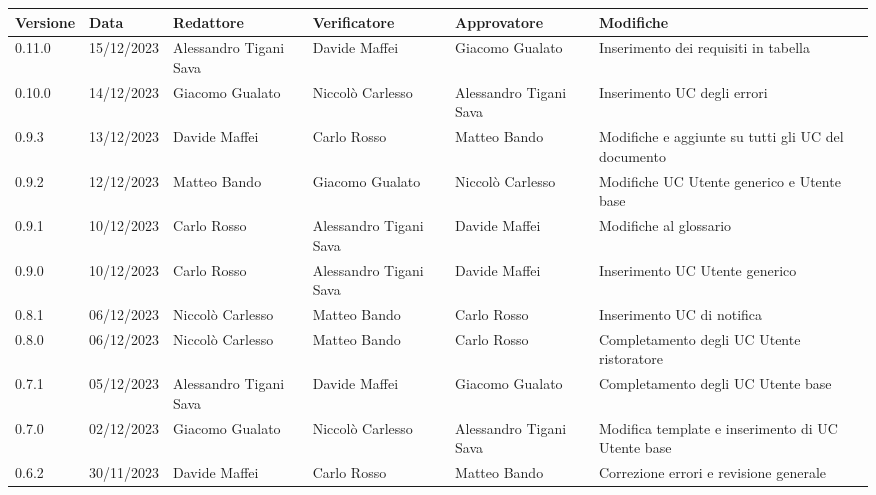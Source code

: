 \begin{table}[H]
	\centering
	\fontsize{10}{12}\selectfont
	\begin{tabularx}{\textwidth}{X|X|X|X|X|X}
		\textbf{Versione}     & \textbf{Data}        & \textbf{Redattore}     &
		\textbf{Verificatore} & \textbf{Approvatore} & \textbf{Modifiche}                                                                                                    \\
		\toprule
		0.11.0                & 15/12/2023           & Alessandro Tigani Sava & Davide Maffei          & Giacomo Gualato        & Inserimento dei requisiti in tabella                                     \\
		\hline
		0.10.0                & 14/12/2023           & Giacomo Gualato        & Niccolò Carlesso       & Alessandro Tigani Sava & Inserimento UC degli errori                                     \\
		0.9.3                 & 13/12/2023           & Davide Maffei          & Carlo Rosso            & Matteo Bando       	& Modifiche e aggiunte su tutti gli UC del documento                                   \\
		\hline
		0.9.2                 & 12/12/2023           & Matteo Bando           & Giacomo Gualato        & Niccolò Carlesso       & Modifiche UC Utente generico e Utente base                                     \\
		\hline
		0.9.1                 & 10/12/2023           & Carlo Rosso            & Alessandro Tigani Sava & Davide Maffei          & Modifiche al glossario                                     \\
		\hline
		0.9.0                 & 10/12/2023           & Carlo Rosso            & Alessandro Tigani Sava & Davide Maffei          & Inserimento UC Utente generico                             \\
		\hline
		0.8.1                 & 06/12/2023           & Niccolò Carlesso       & Matteo Bando           & Carlo Rosso            & Inserimento UC di notifica                                 \\
		\hline
		0.8.0                 & 06/12/2023           & Niccolò Carlesso       & Matteo Bando           & Carlo Rosso            & Completamento degli UC Utente ristoratore                  \\
		\hline
		0.7.1                 & 05/12/2023           & Alessandro Tigani Sava & Davide Maffei          & Giacomo Gualato        & Completamento degli UC Utente base                         \\
		\hline
		0.7.0                 & 02/12/2023           & Giacomo Gualato        & Niccolò Carlesso       & Alessandro Tigani Sava & Modifica template e inserimento di UC Utente base          \\
		\hline
		0.6.2                 & 30/11/2023           & Davide Maffei          & Carlo Rosso            & Matteo Bando           & Correzione errori e revisione generale                     \\
		\bottomrule
	\end{tabularx}
\end{table}



